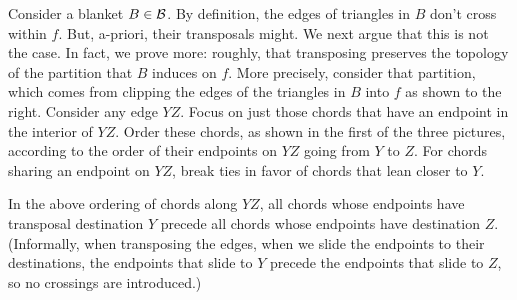 \documentclass[final]{siamltex}
\newcommand{\blanket}{B} \newcommand{\blanketSet}{{\cal B}} \newcommand{\convPart}{\text{\sc cp}}
\newcommand{\face}{f}
\begin{document}
\begin{window}
  Consider a blanket $\blanket\in\blanketSet$.
  By definition, the edges of triangles in $\blanket$ don't cross within $\face$.
  But, a-priori, their transposals might.
  We next argue that this is not the case.
  In fact, we prove more:
  roughly, that transposing preserves 
  the topology of the partition that $\blanket$ induces on $\face$.
  More precisely, consider that partition, which comes from
  clipping the edges of the triangles in $\blanket$ into $\face$
  as shown to the right.
  Consider any edge $Y Z$.
  Focus on just those chords that have an endpoint in the interior of $Y Z$.  
  Order these chords, as shown in the first of the three pictures,
  according to the order of their endpoints on $Y Z$ going from $Y$ to $Z$.
  For chords sharing an endpoint on $Y Z$,
  break ties in favor of chords that lean closer to $Y$.
\end{window}

\begin{lemma}\label{lemma:ordering}
  In the above ordering of chords along $Y Z$,
  all chords whose endpoints have transposal destination $Y$ 
  precede all chords whose endpoints have destination $Z$.
  (Informally, when transposing the edges, when we slide the endpoints
  to their destinations, the endpoints that slide to $Y$ precede
  the endpoints that slide to $Z$, so no crossings are introduced.)
\end{lemma}
\end{document}

